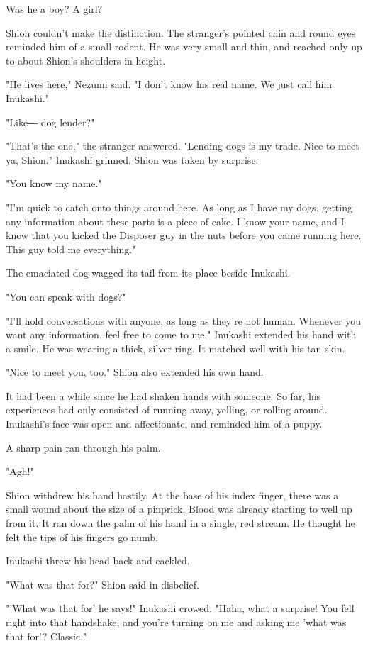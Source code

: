 Was he a boy? A girl?

Shion couldn't make the distinction. The stranger's pointed chin and
round eyes reminded him of a small rodent. He was very small and thin,
and reached only up to about Shion's shoulders in height.

"He lives here," Nezumi said. "I don't know his real name. We just call
him Inukashi."

"Like― dog lender?"

"That's the one," the stranger answered. "Lending dogs is my trade. Nice
to meet ya, Shion." Inukashi grinned. Shion was taken by surprise.

"You know my name."

"I'm quick to catch onto things around here. As long as I have my dogs,
getting any information about these parts is a piece of cake. I know
your name, and I know that you kicked the Disposer guy in the nuts
before you came running here. This guy told me everything."

The emaciated dog wagged its tail from its place beside Inukashi.

"You can speak with dogs?"

"I'll hold conversations with anyone, as long as they're not human.
Whenever you want any information, feel free to come to me." Inukashi
extended his hand with a smile. He was wearing a thick, silver ring. It
matched well with his tan skin.

"Nice to meet you, too." Shion also extended his own hand.

It had been a while since he had shaken hands with someone. So far, his
experiences had only consisted of running away, yelling, or rolling
around. Inukashi's face was open and affectionate, and reminded him of a
puppy.

A sharp pain ran through his palm.

"Agh!"

Shion withdrew his hand hastily. At the base of his index finger, there
was a small wound about the size of a pinprick. Blood was already
starting to well up from it. It ran down the palm of his hand in a
single, red stream. He thought he felt the tips of his fingers go numb.

Inukashi threw his head back and cackled.

"What was that for?" Shion said in disbelief.

"'What was that for' he says!" Inukashi crowed. "Haha, what a surprise!
You fell right into that handshake, and you're turning on me and asking
me 'what was that for'? Classic."

